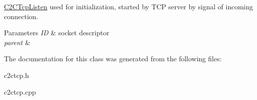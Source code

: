 \hyperlink{classPenguinClient_1_1C2CTcpListen}{C2\-C\-Tcp\-Listen} used for initialization, started by T\-C\-P server by signal of incoming connection. 


\begin{DoxyParams}{Parameters}
{\em I\-D} & socket descriptor \\
\hline
{\em parent} & \\
\hline
\end{DoxyParams}


The documentation for this class was generated from the following files\-:\begin{DoxyCompactItemize}
\item 
c2ctcp.\-h\item 
c2ctcp.\-cpp\end{DoxyCompactItemize}
